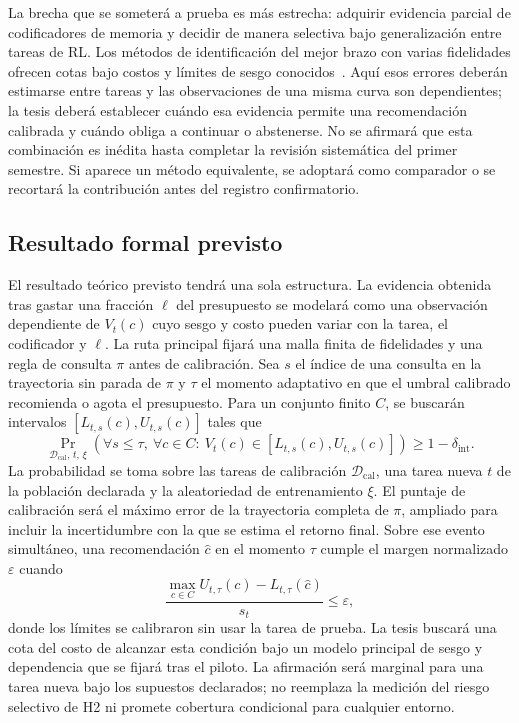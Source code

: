 \documentclass[11pt,letterpaper]{article}
\newcommand{\Vt}{V_t}
\newcommand{\chat}{\hat c}
\begin{document}
La brecha que se someterá a prueba es más estrecha: adquirir evidencia parcial de codificadores de memoria y decidir de manera selectiva bajo generalización entre tareas de RL.
Los métodos de identificación del mejor brazo con varias fidelidades ofrecen cotas bajo costos y límites de sesgo conocidos~\cite{poiani2022mfbai,poiani2024optimal}.
Aquí esos errores deberán estimarse entre tareas y las observaciones de una misma curva son dependientes; la tesis deberá establecer cuándo esa evidencia permite una recomendación calibrada y cuándo obliga a continuar o abstenerse.
No se afirmará que esta combinación es inédita hasta completar la revisión sistemática del primer semestre.
Si aparece un método equivalente, se adoptará como comparador o se recortará la contribución antes del registro confirmatorio.

\subsection{Resultado formal previsto}

El resultado teórico previsto tendrá una sola estructura.
La evidencia obtenida tras gastar una fracción $\ell$ del presupuesto se modelará como una observación dependiente de $\Vt(c)$ cuyo sesgo y costo pueden variar con la tarea, el codificador y $\ell$.
La ruta principal fijará una malla finita de fidelidades y una regla de consulta $\pi$ antes de calibración.
Sea $s$ el índice de una consulta en la trayectoria sin parada de $\pi$ y $\tau$ el momento adaptativo en que el umbral calibrado recomienda o agota el presupuesto.
Para un conjunto finito $C$, se buscarán intervalos $[L_{t,s}(c),U_{t,s}(c)]$ tales que
\begin{equation}
  \Pr_{\mathcal D_{\mathrm{cal}},\,t,\,\xi}\!\left(\forall s\leq\tau,\ \forall c\in C:\
  \Vt(c)\in[L_{t,s}(c),U_{t,s}(c)]\right)\geq 1-\delta_{\mathrm{int}}.
\end{equation}
La probabilidad se toma sobre las tareas de calibración $\mathcal D_{\mathrm{cal}}$, una tarea nueva $t$ de la población declarada y la aleatoriedad de entrenamiento $\xi$.
El puntaje de calibración será el máximo error de la trayectoria completa de $\pi$, ampliado para incluir la incertidumbre con la que se estima el retorno final.
Sobre ese evento simultáneo, una recomendación $\chat$ en el momento $\tau$ cumple el margen normalizado $\varepsilon$ cuando
\begin{equation}
  \frac{\max_{c\in C} U_{t,\tau}(c)-L_{t,\tau}(\chat)}{s_t}\leq\varepsilon,
\end{equation}
donde los límites se calibraron sin usar la tarea de prueba.
La tesis buscará una cota del costo de alcanzar esta condición bajo un modelo principal de sesgo y dependencia que se fijará tras el piloto.
La afirmación será marginal para una tarea nueva bajo los supuestos declarados; no reemplaza la medición del riesgo selectivo de H2 ni promete cobertura condicional para cualquier entorno.
\end{document}
